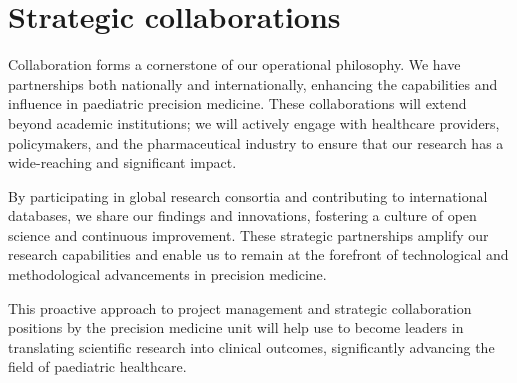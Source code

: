 \section{Strategic collaborations}
Collaboration forms a cornerstone of our operational philosophy. 
We have partnerships both nationally and internationally, enhancing the capabilities and influence in paediatric precision medicine. 
These collaborations will extend beyond academic institutions; we will actively engage with healthcare providers, policymakers, and the pharmaceutical industry to ensure that our research has a wide-reaching and significant impact.

By participating in global research consortia and contributing to international databases, we share our findings and innovations, fostering a culture of open science and continuous improvement. 
These strategic partnerships amplify our research capabilities and enable us to remain at the forefront of technological and methodological advancements in precision medicine.

This proactive approach to project management and strategic collaboration positions by the precision medicine unit will help use to become leaders in translating scientific research into  clinical outcomes, significantly advancing the field of paediatric healthcare.

